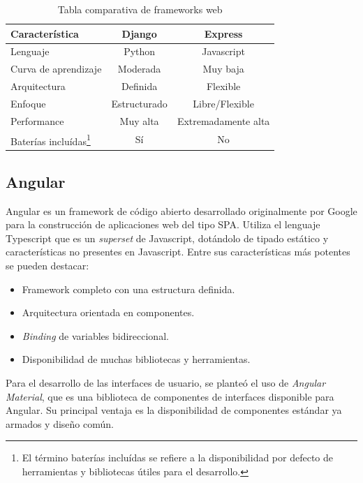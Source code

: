 \begin{table}[H]
	\centering
	\caption[Tabla comparativa]{Tabla comparativa de frameworks web}
	\begin{tabular}{l c c}    
		\toprule
		\textbf{Característica} 	 & \textbf{Django} & \textbf{Express} \\
		\midrule
		Lenguaje & Python & Javascript \\		
		Curva de aprendizaje & Moderada & Muy baja			\\		
		Arquitectura & Definida & Flexible \\
		Enfoque & Estructurado & Libre/Flexible		\\
		Performance & Muy alta & Extremadamente alta \\
		Baterías incluídas\footnote{El término baterías incluídas se refiere a la disponibilidad por defecto de herramientas y bibliotecas útiles para el desarrollo.} & Sí & No \\
		\bottomrule
		\hline
	\end{tabular}
	\label{tab:peces}
\end{table}

\subsection{Angular}

Angular es un framework de código abierto desarrollado originalmente por Google para la construcción de aplicaciones web del tipo SPA\citep{ANGULAR:1}. Utiliza el lenguaje Typescript que es un \textit{superset} de Javascript, dotándolo de tipado estático y características no presentes en Javascript. Entre sus características más potentes se pueden destacar\citep{ANGULAR:2}:
\begin{itemize}
	\item Framework completo con una estructura definida.
	\item Arquitectura orientada en componentes.
	\item \textit{Binding} de variables bidireccional.
	\item Disponibilidad de muchas bibliotecas y herramientas.
\end{itemize}

Para el desarrollo de las interfaces de usuario, se planteó el uso de \textit{Angular Material}, que es una biblioteca de componentes de interfaces disponible para Angular. Su principal ventaja es la disponibilidad de componentes estándar ya armados y diseño común\citep{ANGULAR:3}.

